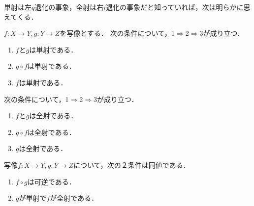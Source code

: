 \documentclass[uplatex,dvipdfmx]{jsreport}
\begin{document}
単射は左$q$退化の事象，全射は右$i$退化の事象だと知っていれば，次は明らかに思えてくる．
\begin{lemma}
    $f:X\to Y, g:Y\to Z$を写像とする．
    次の条件について，1$\Rightarrow$2$\Rightarrow$3が成り立つ．
    \begin{enumerate}
        \item $f$と$g$は単射である．
        \item $g\circ f$は単射である．
        \item $f$は単射である．
    \end{enumerate}
    次の条件について，1$\Rightarrow$2$\Rightarrow$3が成り立つ．
    \begin{enumerate}
        \item $f$と$g$は全射である．
        \item $g\circ f$は全射である．
        \item $g$は全射である．
    \end{enumerate}
\end{lemma}

\begin{proposition}
    写像$f:X\to Y,g:Y\to Z$について，次の２条件は同値である．
    \begin{enumerate}
        \item $f\circ g$は可逆である．
        \item $g$が単射で$f$が全射である．
    \end{enumerate}
\end{proposition}
\end{document}
